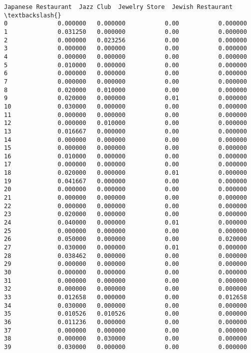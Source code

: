 \documentclass[11pt]{article}
\begin{document}
\begin{tcolorbox}[breakable, size=fbox, boxrule=.5pt, pad at break*=1mm, opacityfill=0]
\begin{Verbatim}[commandchars=\\\{\}]
    Japanese Restaurant  Jazz Club  Jewelry Store  Jewish Restaurant  \textbackslash{}
0              0.000000   0.000000           0.00           0.000000
1              0.031250   0.000000           0.00           0.000000
2              0.000000   0.023256           0.00           0.000000
3              0.000000   0.000000           0.00           0.000000
4              0.000000   0.000000           0.00           0.000000
5              0.010000   0.000000           0.00           0.000000
6              0.000000   0.000000           0.00           0.000000
7              0.000000   0.000000           0.00           0.000000
8              0.020000   0.010000           0.00           0.000000
9              0.020000   0.000000           0.01           0.000000
10             0.030000   0.000000           0.00           0.000000
11             0.000000   0.000000           0.00           0.000000
12             0.000000   0.010000           0.00           0.000000
13             0.016667   0.000000           0.00           0.000000
14             0.000000   0.000000           0.00           0.000000
15             0.000000   0.000000           0.00           0.000000
16             0.010000   0.000000           0.00           0.000000
17             0.000000   0.000000           0.00           0.000000
18             0.020000   0.000000           0.01           0.000000
19             0.041667   0.000000           0.00           0.000000
20             0.000000   0.000000           0.00           0.000000
21             0.000000   0.000000           0.00           0.000000
22             0.000000   0.000000           0.00           0.000000
23             0.020000   0.000000           0.00           0.000000
24             0.040000   0.000000           0.01           0.000000
25             0.000000   0.000000           0.00           0.000000
26             0.050000   0.000000           0.00           0.020000
27             0.030000   0.000000           0.01           0.000000
28             0.038462   0.000000           0.00           0.000000
29             0.000000   0.000000           0.00           0.000000
30             0.000000   0.000000           0.00           0.000000
31             0.000000   0.000000           0.00           0.000000
32             0.000000   0.000000           0.00           0.000000
33             0.012658   0.000000           0.00           0.012658
34             0.030000   0.000000           0.00           0.000000
35             0.010526   0.010526           0.00           0.000000
36             0.011236   0.000000           0.00           0.000000
37             0.000000   0.000000           0.00           0.000000
38             0.000000   0.030000           0.00           0.000000
39             0.030000   0.000000           0.00           0.000000


\end{Verbatim}
\end{tcolorbox}
\end{document}
